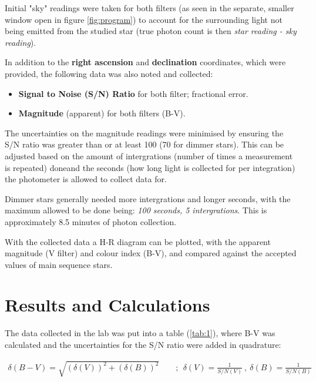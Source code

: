 \documentclass[12pt]{article}
\begin{document}
Initial "sky" readings were taken for both filters (as seen in the separate, smaller window open in figure \ref{fig:program}) to account for the surrounding light not being emitted
from the studied star (true photon count is then \textit{star reading - sky reading}).

In addition to the \textbf{right ascension} and \textbf{declination} coordinates, which were provided, the following data was also noted and collected:

\begin{itemize}
    \item \textbf{Signal to Noise (S/N) Ratio} for both filter; fractional error.
    \item \textbf{Magnitude} (apparent) for both filters (B-V).
\end{itemize}

The uncertainties on the magnitude readings were minimised by ensuring the S/N ratio was greater than or at least 100 (70 for dimmer stars). This can be adjusted based on the amount of intergrations 
(number of times a measurement is repeated) doneand the seconds (how long light is collected for per integration) the photometer is allowed to collect data for. 

Dimmer stars generally needed more intergrations and longer seconds, with the maximum allowed to be done being: \textit{100 seconds, 5 intergrations}. This is approximately 8.5 minutes of photon collection.

With the collected data a H-R diagram can be plotted, with the apparent magnitude (V filter) and colour index (B-V), and compared against the accepted values of main sequence stars.

\section{Results and Calculations} \label{sec:3}

The data collected in the lab was put into a table (\ref{tab:1}), where B-V was calculated and the uncertainties for the S/N ratio were added in quadrature:

\vspace{-1.5ex}
\begin{gather*}
    \delta(B-V) = \sqrt{(\delta(V))^2 + (\delta(B))^2} \qquad ; \:\: \delta(V) = \frac{1}{S/N(V)} \: , \: \delta(B) = \frac{1}{S/N(B)}
\end{gather*}
\end{document}
